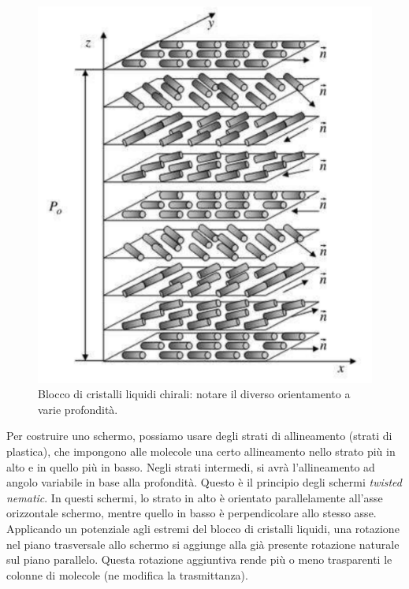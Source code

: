 \documentclass[a4paper,11pt]{article}
\begin{document}
\renewcommand{\thefigure}{4.1}
\begin{figure}[!h]
  \centering
    \includegraphics[scale=0.4]{images/4/tn_block.png}
    \caption{Blocco di cristalli liquidi chirali: notare il diverso orientamento a varie profondità.}
\end{figure}

Per costruire uno schermo, possiamo usare degli strati di allineamento (strati di plastica), che impongono alle molecole
una certo allineamento nello strato più in alto e in quello più in basso. Negli strati intermedi, si avrà
l'allineamento ad angolo variabile in base alla profondità. Questo è il principio degli schermi \textit{twisted nematic}.
In questi schermi, lo strato in alto è orientato parallelamente all'asse orizzontale schermo, mentre
quello in basso è perpendicolare allo stesso asse. Applicando un potenziale agli estremi del blocco di cristalli liquidi,
una rotazione nel piano trasversale allo schermo si aggiunge alla già presente rotazione naturale sul piano parallelo.
Questa rotazione aggiuntiva rende più o meno trasparenti le colonne di molecole (ne modifica la trasmittanza).
\end{document}

